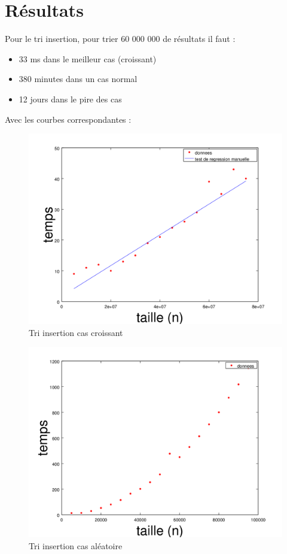 \documentclass{article}
\begin{document}
\section{Résultats}
Pour le tri insertion, pour trier 60 000 000 de résultats il faut :
\begin{itemize}
  \item 33 ms dans le meilleur cas (croissant)
  \item 380 minutes dans un cas normal
  \item 12 jours dans le pire des cas
\end{itemize}
Avec les courbes correspondantes :
\begin{figure}
	\begin{center}
		\includegraphics[scale=0.7]{croissant}\\
		Tri insertion cas croissant
	\end{center}
\end{figure}
\begin{figure}
	\begin{center}
		\includegraphics[scale=0.7]{random}\\
		Tri insertion cas aléatoire
	\end{center}
\end{figure}
\end{document}
